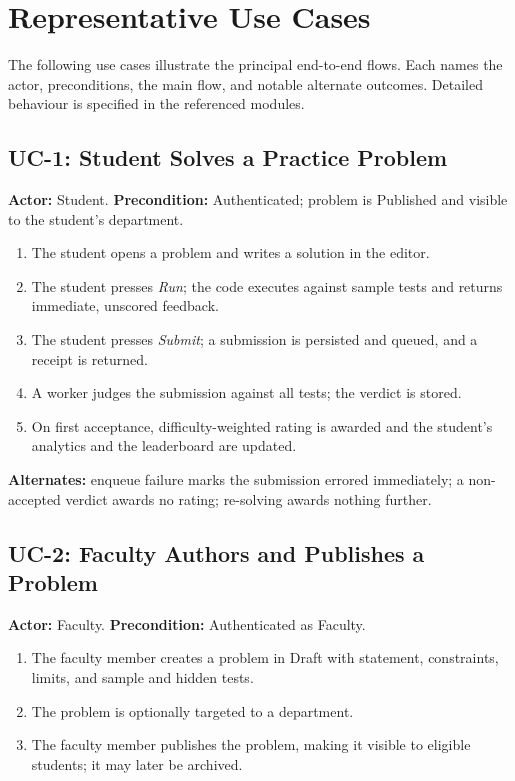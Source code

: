 \documentclass[12pt,a4paper,oneside]{report}
\begin{document}
\chapter{Representative Use Cases}
The following use cases illustrate the principal end-to-end flows. Each names the
actor, preconditions, the main flow, and notable alternate outcomes. Detailed
behaviour is specified in the referenced modules.

\section{UC-1: Student Solves a Practice Problem}
\textbf{Actor:} Student. \quad \textbf{Precondition:} Authenticated; problem is
Published and visible to the student's department.
\begin{enumerate}[leftmargin=1.6em]
  \item The student opens a problem and writes a solution in the editor.
  \item The student presses \emph{Run}; the code executes against sample tests
        and returns immediate, unscored feedback.
  \item The student presses \emph{Submit}; a submission is persisted and queued,
        and a receipt is returned.
  \item A worker judges the submission against all tests; the verdict is stored.
  \item On first acceptance, difficulty-weighted rating is awarded and the
        student's analytics and the leaderboard are updated.
\end{enumerate}
\textbf{Alternates:} enqueue failure marks the submission errored immediately; a
non-accepted verdict awards no rating; re-solving awards nothing further.

\section{UC-2: Faculty Authors and Publishes a Problem}
\textbf{Actor:} Faculty. \quad \textbf{Precondition:} Authenticated as Faculty.
\begin{enumerate}[leftmargin=1.6em]
  \item The faculty member creates a problem in Draft with statement,
        constraints, limits, and sample and hidden tests.
  \item The problem is optionally targeted to a department.
  \item The faculty member publishes the problem, making it visible to eligible
        students; it may later be archived.
\end{enumerate}
\end{document}
